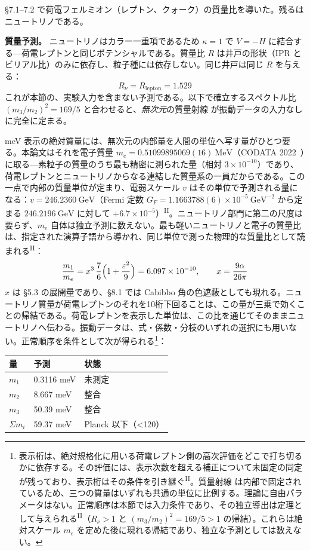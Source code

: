 \documentclass[fontsize=11pt,paper=a4,lualatex]{jlreq}
\newcommand{\PII}{\textsuperscript{\textup{II}}}
\begin{document}
§7.1--7.2 で荷電フェルミオン（レプトン、クォーク）の質量比を導いた。残るはニュートリノである。

\noindent\textbf{質量予測。}
ニュートリノはカラー一重項であるため $\kappa = 1$ で $V = -H$ に結合する---荷電レプトンと同じポテンシャルである。質量比 $R$ は井戸の形状（IPR とビリアル比）のみに依存し、粒子種には依存しない。同じ井戸は同じ $R$ を与える：
\[R_\nu = R_\mathrm{lepton} = 1.529\]
これが本節の、実験入力を含まない予測である。以下で確立するスペクトル比 $(m_3/m_2)^2 = 169/5$ と合わせると、\emph{無次元}の質量射線 が振動データの入力なしに完全に定まる。

meV 表示の絶対質量には、無次元の内部量を人間の単位へ写す量がひとつ要る。本論文はそれを電子質量 $m_e = 0.51099895069(16)~\mathrm{MeV}$（CODATA 2022~\cite{codata}）に取る---素粒子の質量のうち最も精密に測られた量（相対 $3\times10^{-10}$）であり、荷電レプトンとニュートリノからなる連結した質量系の一員だからである。この一点で内部の質量単位が定まり、電弱スケール $v$ はその単位で予測される量になる：$v = 246.2360~\mathrm{GeV}$（Fermi 定数 $G_F = 1.1663788(6)\times10^{-5}~\mathrm{GeV}^{-2}$ から定まる $246.2196~\mathrm{GeV}$ に対して $+6.7\times10^{-5}$）\PII{}。ニュートリノ部門に第二の尺度は要らず、$m_e$ 自体は独立予測に数えない。最も軽いニュートリノと電子の質量比は、指定された演算子語から導かれ、同じ単位で測った物理的な質量比として読まれる\PII{}：
\[\frac{m_1}{m_e} = x^3\,\frac{7}{6}\Bigl(1 + \frac{\varepsilon^2}{9}\Bigr) = 6.097 \times 10^{-10},\qquad x = \frac{9\alpha}{26\pi}\]
$x$ は §5.3 の展開量であり、§8.1 では Cabibbo 角の色遮蔽としても現れる。ニュートリノ質量が荷電レプトンのそれを10桁下回ることは、この量が三乗で効くことの帰結である。荷電レプトンを表示した単位は、この比を通じてそのままニュートリノへ伝わる。振動データは、式・係数・分枝のいずれの選択にも用いない。正常順序を条件として次が得られる\footnote{表示桁は、絶対規格化に用いる荷電レプトン側の高次評価をどこで打ち切るかに依存する。その評価には、表示次数を超える補正について未固定の同定が残っており、表示桁はその条件を引き継ぐ\PII{}。質量射線 は内部で固定されているため、三つの質量はいずれも共通の単位に比例する。理論に自由パラメータはない。正常順序は本節では入力条件であり、その独立導出は定理として与えられる\PII{}（$R_\nu > 1$ と $(m_3/m_2)^2 = 169/5 > 1$ の帰結）。これらは絶対スケール $m_e$ を定めた後に現れる帰結であり、独立な予測としては数えない。}：

\begin{longtable}[]{@{}lll@{}}
\toprule\noalign{}
量 & 予測 & 状態 \\
\midrule\noalign{}
\endhead
\bottomrule\noalign{}
\endlastfoot
$m_1$ & 0.3116 meV & 未測定 \\
$m_2$ & 8.667 meV & 整合 \\
$m_3$ & 50.39 meV & 整合 \\
$\Sigma m_i$ & 59.37 meV & Planck 以下（\textless120） \\
\end{longtable}
\end{document}
